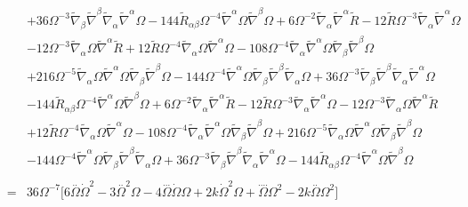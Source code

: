 \documentclass[10pt,letterpaper]{article}
\numberwithin{equation}{section}
\begin{document}
\begin{eqnarray}
&& + 36 \Omega^{-3} \tilde\nabla_{\beta }\tilde \nabla^{\beta }\tilde\nabla_{\alpha }\tilde \nabla^{\alpha }\Omega - 144 \tilde R_{\alpha \beta } \Omega^{-4} \tilde \nabla^{\alpha }\Omega \tilde \nabla^{\beta }\Omega +6 \Omega^{-2} \tilde\nabla_{\alpha }\tilde \nabla^{\alpha }\tilde R - 12 \tilde R \Omega^{-3} \tilde\nabla_{\alpha }\tilde \nabla^{\alpha }\Omega \nonumber \\ 
&& - 12 \Omega^{-3} \tilde\nabla_{\alpha }\Omega \tilde \nabla^{\alpha }\tilde R + 12 \tilde R \Omega^{-4} \tilde\nabla_{\alpha }\Omega \tilde \nabla^{\alpha }\Omega - 108 \Omega^{-4} \tilde\nabla_{\alpha }\tilde \nabla^{\alpha }\Omega \tilde\nabla_{\beta }\tilde \nabla^{\beta }\Omega \nonumber \\ 
&& + 216 \Omega^{-5} \tilde\nabla_{\alpha }\Omega \tilde \nabla^{\alpha }\Omega \tilde\nabla_{\beta }\tilde \nabla^{\beta }\Omega - 144 \Omega^{-4} \tilde \nabla^{\alpha }\Omega \tilde\nabla_{\beta }\tilde \nabla^{\beta }\tilde\nabla_{\alpha }\Omega + 36 \Omega^{-3} \tilde\nabla_{\beta }\tilde \nabla^{\beta }\tilde\nabla_{\alpha }\tilde \nabla^{\alpha }\Omega \nonumber \\ 
&& - 144 \tilde R_{\alpha \beta } \Omega^{-4} \tilde \nabla^{\alpha }\Omega \tilde \nabla^{\beta }\Omega +6 \Omega^{-2} \tilde\nabla_{\alpha }\tilde \nabla^{\alpha }\tilde R - 12 \tilde R \Omega^{-3} \tilde\nabla_{\alpha }\tilde \nabla^{\alpha }\Omega - 12 \Omega^{-3} \tilde\nabla_{\alpha }\Omega \tilde \nabla^{\alpha }\tilde R \nonumber \\ 
&& + 12 \tilde R \Omega^{-4} \tilde\nabla_{\alpha }\Omega \tilde \nabla^{\alpha }\Omega - 108 \Omega^{-4} \tilde\nabla_{\alpha }\tilde \nabla^{\alpha }\Omega \tilde\nabla_{\beta }\tilde \nabla^{\beta }\Omega + 216 \Omega^{-5} \tilde\nabla_{\alpha }\Omega \tilde \nabla^{\alpha }\Omega \tilde\nabla_{\beta }\tilde \nabla^{\beta }\Omega \nonumber \\ 
&& - 144 \Omega^{-4} \tilde \nabla^{\alpha }\Omega \tilde\nabla_{\beta }\tilde \nabla^{\beta }\tilde\nabla_{\alpha }\Omega + 36 \Omega^{-3} \tilde\nabla_{\beta }\tilde \nabla^{\beta }\tilde\nabla_{\alpha }\tilde \nabla^{\alpha }\Omega - 144 \tilde R_{\alpha \beta } \Omega^{-4} \tilde \nabla^{\alpha }\Omega \tilde \nabla^{\beta }\Omega 
\\ \nonumber\\
&=& 36\Omega^{-7}\bigg[ 
6 \overset{..}{\Omega} \dot{\Omega}^2 - 3 \overset{..}{\Omega}^2 \Omega - 4 \overset{...}{\Omega} \dot{\Omega} \Omega + 2 k \dot{\Omega}^2 \Omega + \overset{....}{\Omega} \Omega^2 - 2 k \overset{..}{\Omega} \Omega^2
\bigg]
\label{W1tr}
\end{eqnarray}
\end{document}
